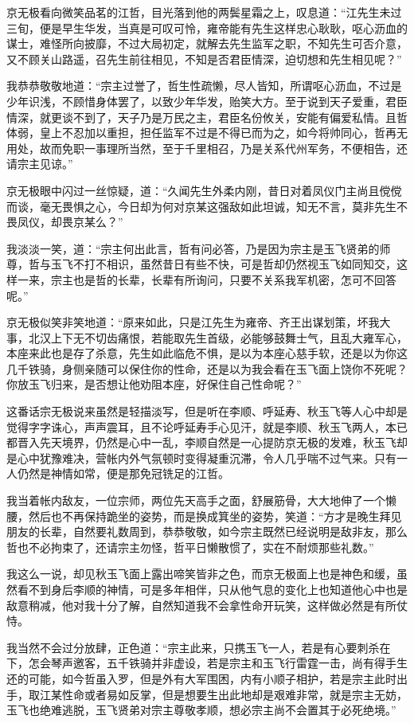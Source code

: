 京无极看向微笑品茗的江哲，目光落到他的两鬓星霜之上，叹息道：“江先生未过三旬，便是早生华发，当真是可叹可怜，雍帝能有先生这样忠心耿耿，呕心沥血的谋士，难怪所向披靡，不过大局初定，就解去先生监军之职，不知先生可否介意，又不顾关山路遥，召先生前往相见，不知是否君臣情深，迫切想和先生相见呢？”

我恭恭敬敬地道：“宗主过誉了，哲生性疏懒，尽人皆知，所谓呕心沥血，不过是少年识浅，不顾惜身体罢了，以致少年华发，贻笑大方。至于说到天子爱重，君臣情深，就更谈不到了，天子乃是万民之主，君臣名份攸关，安能有偏爱私情。且哲体弱，皇上不忍加以重担，担任监军不过是不得已而为之，如今将帅同心，哲再无用处，故而免职一事理所当然，至于千里相召，乃是关系代州军务，不便相告，还请宗主见谅。”

京无极眼中闪过一丝惊疑，道：“久闻先生外柔内刚，昔日对着凤仪门主尚且傥傥而谈，毫无畏惧之心，今日却为何对京某这强敌如此坦诚，知无不言，莫非先生不畏凤仪，却畏京某么？”

我淡淡一笑，道：“宗主何出此言，哲有问必答，乃是因为宗主是玉飞贤弟的师尊，哲与玉飞不打不相识，虽然昔日有些不快，可是哲却仍然视玉飞如同知交，这样一来，宗主也是哲的长辈，长辈有所询问，只要不关系我军机密，怎可不回答呢。”

京无极似笑非笑地道：“原来如此，只是江先生为雍帝、齐王出谋划策，坏我大事，北汉上下无不切齿痛恨，若能取先生首级，必能够鼓舞士气，且乱大雍军心，本座来此也是存了杀意，先生如此临危不惧，是以为本座心慈手软，还是以为你这几千铁骑，身侧亲随可以保住你的性命，还是以为我会看在玉飞面上饶你不死呢？你放玉飞归来，是否想让他劝阻本座，好保住自己性命呢？”

这番话宗无极说来虽然是轻描淡写，但是听在李顺、呼延寿、秋玉飞等人心中却是觉得字字诛心，声声震耳，且不论呼延寿手心见汗，就是李顺、秋玉飞两人，本已都晋入先天境界，仍然是心中一乱，李顺自然是一心提防京无极的发难，秋玉飞却是心中犹豫难决，营帐内外气氛顿时变得凝重沉滞，令人几乎喘不过气来。只有一人仍然是神情如常，便是那免冠铣足的江哲。

我当着帐内敌友，一位宗师，两位先天高手之面，舒展筋骨，大大地伸了一个懒腰，然后也不再保持跪坐的姿势，而是换成箕坐的姿势，笑道：“方才是晚生拜见朋友的长辈，自然要礼数周到，恭恭敬敬，如今宗主既然已经说明是敌非友，那么哲也不必拘束了，还请宗主勿怪，哲平日懒散惯了，实在不耐烦那些礼数。”

我这么一说，却见秋玉飞面上露出啼笑皆非之色，而京无极面上也是神色和缓，虽然看不到身后李顺的神情，可是多年相伴，只从他气息的变化上也知道他心中也是敌意稍减，他对我十分了解，自然知道我不会拿性命开玩笑，这样做必然是有所仗恃。

我当然不会过分放肆，正色道：“宗主此来，只携玉飞一人，若是有心要刺杀在下，怎会琴声邀客，五千铁骑并非虚设，若是宗主和玉飞行雷霆一击，尚有得手生还的可能，如今哲虽入罗，但是外有大军围困，内有小顺子相护，若是宗主此时出手，取江某性命或者易如反掌，但是想要生出此地却是艰难非常，就是宗主无妨，玉飞也绝难逃脱，玉飞贤弟对宗主尊敬孝顺，想必宗主尚不会置其于必死绝境。”

